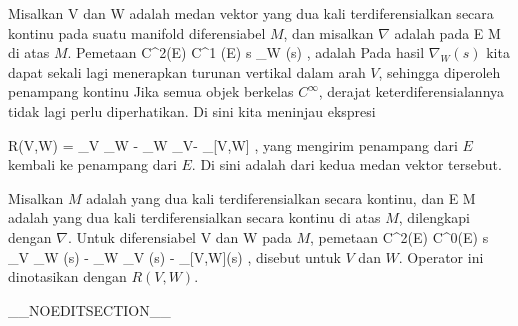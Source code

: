 \setcounter{section}{28}


Misalkan
\mathkor {} {V} {dan} {W} {}
adalah medan vektor yang dua kali terdiferensialkan secara kontinu pada suatu manifold diferensiabel $M$, dan misalkan $\nabla$ adalah
pada
 { E } { M
} {}
di atas $M$. Pemetaan
 {C^2(E) } { C^1 (E)
} { s } { \nabla_W (s)
} {,}
adalah
Pada hasil $\nabla_W (s)$ kita dapat sekali lagi menerapkan turunan vertikal dalam arah $V$, sehingga diperoleh penampang kontinu
 Jika semua objek berkelas $C^\infty$, derajat keterdiferensialannya tidak lagi perlu diperhatikan. Di sini kita meninjau ekspresi

\mavergleichskettedisp
{\vergleichskette
{ R(V,W)
}
{ =} { \nabla_V \nabla_W - \nabla_W \nabla_V- \nabla_{[V,W]}
}
{ } {
}
{ } {
}
{ } {
}
}
{}{}{,}
yang mengirim penampang
 {} {}
dari $E$ kembali ke penampang dari $E$. Di sini
\mathl{[V,W]}{} adalah
dari kedua medan vektor tersebut.

{}
{

Misalkan $M$ adalah
yang dua kali terdiferensialkan secara kontinu, dan
\maabb {} { E } { M
} {}
adalah
yang dua kali terdiferensialkan secara kontinu di atas $M$, dilengkapi dengan
$\nabla$. Untuk
diferensiabel
\mathkor {} {V} {dan} {W} {}
pada $M$, pemetaan
\maabbeledisp {} {C^2(E)} {C^0(E)
} { s } { \nabla_V \nabla_W (s) - \nabla_W \nabla_V (s) - \nabla_{[V,W]}(s)
} {,}
disebut
untuk $V$ dan $W$. Operator ini dinotasikan dengan $R(V,W)$.

}

__NOEDITSECTION__

